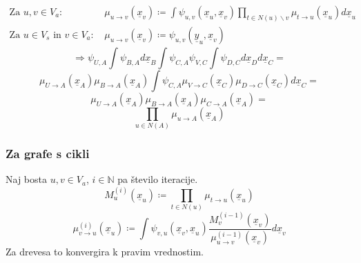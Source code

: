 \documentclass{beamer}
\theoremstyle{definition}
\begin{document}
	\begin{frame}
		\begin{align*}
			\text{Za } u,v \in V_a\text{: } &
			\mu_{u \to v}\left(\underline{x}_v\right) \coloneqq
			\int \psi_{u,v}\left(\underline{x}_u,\underline{x}_v\right)
			\prod_{t\in N\left(u\right)\backslash v}
			\mu_{t \to u}\left(\underline{x}_u\right)d\underline{x}_u
			\\
			\text{Za }u \in V_s\text{ in }v \in V_a\text{: } &
			\mu_{u \to v}\left(\underline{x}_v\right) \coloneqq
			\psi_{u,v}\left(\underline{y}_u,\underline{x}_v\right)
		\end{align*}
		\pause
		$$
		\Rightarrow
		\psi_{U,A} \int \psi_{B,A}d\underline{x}_B \int \psi_{C,A} \psi_{V,C}
		\int \psi_{D,C}d\underline{x}_Dd\underline{x}_C=
		$$
		\pause
		$$
		\mu_{U \to A}\left(\underline{x}_A\right)\mu_{B \to A}\left(\underline{x}_A\right)
		\int \psi_{C,A}
		\mu_{V \to C}\left(\underline{x}_C\right)
		\mu_{D \to C}\left(\underline{x}_C\right)d\underline{x}_C=
		$$
		\pause
		$$
		\mu_{U \to A}\left(\underline{x}_A\right)\mu_{B \to A}\left(\underline{x}_A\right)
		\mu_{C \to A}\left(\underline{x}_A\right) =
		$$
		$$
		\prod_{u \in N\left(A\right)}\mu_{u \to A}\left(\underline{x}_A\right)
		$$
	\end{frame}

	\begin{frame}
		\frametitle{Za grafe s cikli}
		Naj bosta $u,v \in V_a$, $i \in \mathbb{N}$ pa število iteracije.
		$$
		M_u^{\left(i\right)}\left(\underline{x}_u\right) \coloneqq
		\prod_{t \in N\left(u\right)}\mu_{t \to u}\left(\underline{x}_u\right)
		$$
		$$
		\mu_{v \to u}^{\left(i\right)}\left(\underline{x}_u\right) \coloneqq
		\int \psi_{v,u}\left(\underline{x}_v,\underline{x}_u\right)
		\frac{
			M_v^{\left(i-1\right)}\left(\underline{x}_v\right)}{
			\mu_{u \to v}^{\left(i-1\right)}\left(\underline{x}_v\right)
		}d\underline{x}_v
		$$
		Za drevesa to konvergira k pravim vrednostim.
	\end{frame}
\end{document}
